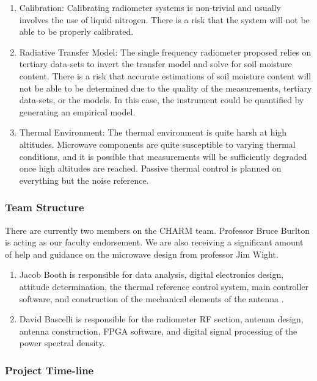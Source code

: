 \documentclass[12pt]{article}
\begin{document}
\begin{enumerate}
\begin{enumerate}
\item Calibration: Calibrating radiometer systems is non-trivial and usually involves the use of liquid nitrogen. There is a risk that the system will not be able to be properly calibrated.

\item Radiative Transfer Model: The single frequency radiometer proposed relies on tertiary data-sets to invert the transfer model and solve for soil moisture content. There is a risk that accurate estimations of soil moisture content will not be able to be determined due to the quality of the measurements, tertiary data-sets, or the models. In this case, the instrument could be quantified by generating an empirical model.

\item Thermal Environment: The thermal environment is quite harsh at high altitudes. Microwave components are quite susceptible to varying thermal conditions, and it is possible that measurements will be sufficiently degraded once high altitudes are reached. Passive thermal control is planned on everything but the noise reference.

\end{enumerate}
\end{enumerate}

\subsubsection{Team Structure}
There are currently two members on the CHARM team. Professor Bruce Burlton is acting as our faculty endorsement. We are also receiving a significant amount of help and guidance on the microwave design from professor Jim Wight.

\begin{enumerate}
\item Jacob Booth is responsible for data analysis, digital electronics design, attitude determination, the thermal reference control system, main controller software, and construction of the mechanical elements of the antenna .

\item David Bascelli is responsible for the radiometer RF section, antenna design, antenna construction, FPGA software, and digital signal processing of the power spectral density.

\end{enumerate}

\newpage

\subsubsection{Project Time-line}
\end{document}
